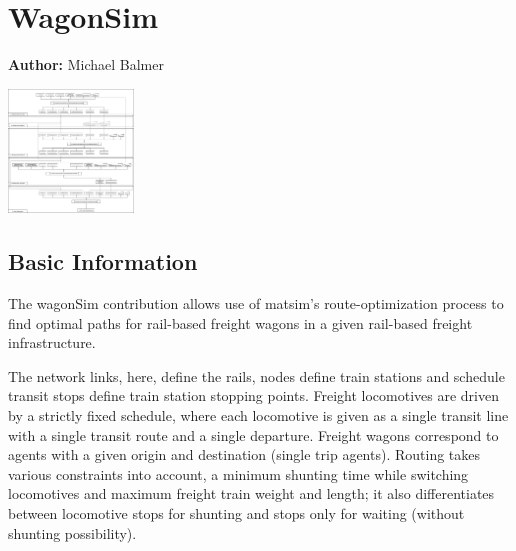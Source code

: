 \chapter{WagonSim}
\label{ch:wagonSim}

\hfill \textbf{Author:} Michael Balmer

\begin{center} \includegraphics[width=0.25\textwidth, angle=0]{extending/figures/wagonsim/wagonSimProcessChain.png} \end{center}





\section{Basic Information}

The wagonSim \gls{contribution} allows use of \gls{matsim}'s route-optimization process to find optimal paths for rail-based freight wagons in a given rail-based freight infrastructure.

The network links, here, define the rails, nodes define train stations and schedule transit stops define train station stopping points. 
Freight locomotives are driven by a strictly fixed schedule, where each locomotive is given as a single transit line with a single transit route and a single departure. 
Freight wagons correspond to agents with a given origin and destination (single trip agents). 
Routing takes various constraints into account, \ie a minimum shunting time while switching locomotives and maximum freight train weight and length; it also differentiates between locomotive stops for shunting and stops  only for waiting (without shunting possibility).

